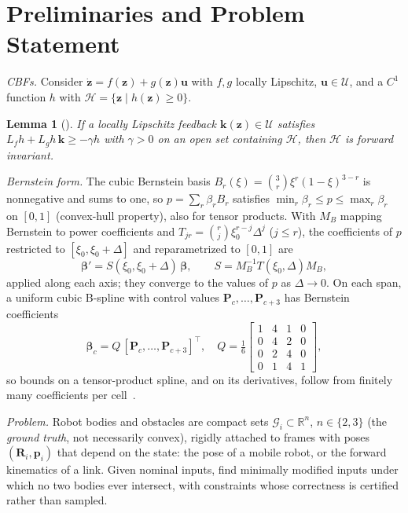 \documentclass[journal]{IEEEtran}
\newtheorem{lemma}{Lemma}
\theoremstyle{definition}
\newcommand{\R}{\mathbb{R}}
\newcommand{\Rot}{\mathbf{R}}
\begin{document}
\section{Preliminaries and Problem Statement}\label{sec:prelim}

\emph{CBFs.} Consider $\dot{\mathbf z}=f(\mathbf z)+g(\mathbf z)\mathbf u$ with $f,g$ locally
Lipschitz, $\mathbf u\in\mathcal U$, and a $C^1$ function $h$ with
$\mathcal H=\{\mathbf z\mid h(\mathbf z)\ge0\}$.
\begin{lemma}[\cite{ames2019cbf}]\label{lem:cbf}
If a locally Lipschitz feedback $\mathbf k(\mathbf z)\in\mathcal U$ satisfies
$L_fh+L_gh\,\mathbf k\ge-\gamma h$ with $\gamma>0$ on an open set containing $\mathcal H$, then
$\mathcal H$ is forward invariant.
\end{lemma}

\emph{Bernstein form.} The cubic Bernstein basis $B_r(\xi)=\binom3r\xi^r(1-\xi)^{3-r}$ is
nonnegative and sums to one, so $p=\sum_r\beta_rB_r$ satisfies $\min_r\beta_r\le p\le\max_r\beta_r$
on $[0,1]$ (convex-hull property), also for tensor products. With $M_B$ mapping Bernstein to power
coefficients and $T_{jr}=\binom rj\xi_0^{r-j}\Delta^j$ ($j\le r$), the coefficients of $p$ restricted
to $[\xi_0,\xi_0+\Delta]$ and reparametrized to $[0,1]$ are
\begin{equation}\label{eq:subdiv}
\boldsymbol\beta'=S(\xi_0,\xi_0+\Delta)\,\boldsymbol\beta,\qquad S=M_B^{-1}T(\xi_0,\Delta)M_B,
\end{equation}
applied along each axis; they converge to the values of $p$ as $\Delta\to0$. On each span, a uniform
cubic B-spline with control values $\mathbf P_c,\dots,\mathbf P_{c+3}$ has Bernstein coefficients
\begin{equation}\label{eq:b2b}
\boldsymbol\beta_c=Q\,[\mathbf P_{c},\dots,\mathbf P_{c+3}]^{\top},\quad
Q=\tfrac16\left[\begin{smallmatrix}1&4&1&0\\0&4&2&0\\0&2&4&0\\0&1&4&1\end{smallmatrix}\right],
\end{equation}
so bounds on a tensor-product spline, and on its derivatives, follow from finitely many
coefficients per cell~\cite{farin2002curves,jo2027semantic}.

\emph{Problem.} Robot bodies and obstacles are compact sets $\mathcal G_i\subset\R^n$, $n\in\{2,3\}$
(the \emph{ground truth}, not necessarily convex), rigidly attached to frames with poses
$(\Rot_i,\mathbf p_i)$ that depend on the state: the pose of a mobile robot, or the forward
kinematics of a link. Given nominal inputs, find minimally modified inputs under which no two
bodies ever intersect, with constraints whose correctness is certified rather than sampled.
\end{document}
